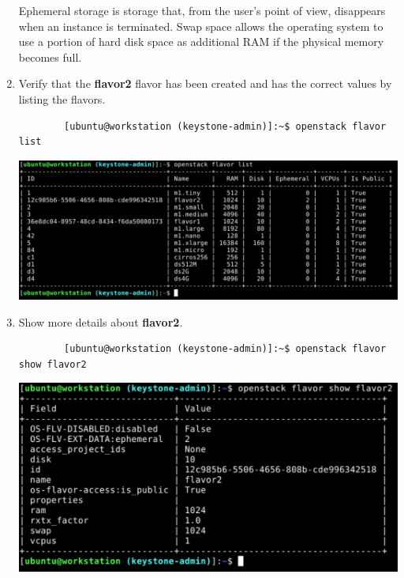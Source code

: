 \documentclass[letterpaper, 12pt]{article}
\begin{document}
\begin{enumerate}
    \begin{notebox}
        Ephemeral storage is storage that, from the user's point of view, disappears when an instance is terminated.
        Swap space allows the operating system to use a portion of hard disk space as additional RAM if the physical
        memory becomes full.
    \end{notebox}

    \item Verify that the \textbf{flavor2} flavor has been created and has the correct values by listing the flavors.
    \begin{lstlisting}
        [ubuntu@workstation (keystone-admin)]:~$ openstack flavor list
    \end{lstlisting}

    \begin{center}
        \includegraphics[width=\linewidth]{images/part2/step9.png}
    \end{center}

    \item Show more details about \textbf{flavor2}.
    \begin{lstlisting}
        [ubuntu@workstation (keystone-admin)]:~$ openstack flavor show flavor2
    \end{lstlisting}

    \begin{center}
        \includegraphics[width=\linewidth]{images/part2/step10.png}
    \end{center}


\end{enumerate}
\end{document}
